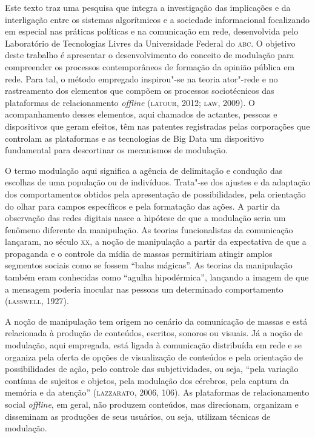 
\noindent{}Este texto traz uma pesquisa que integra a investigação das implicações
e da interligação entre os sistemas algorítmicos e a sociedade
informacional focalizando em especial nas práticas políticas e na
comunicação em rede, desenvolvida pelo Laboratório de Tecnologias Livres
da Universidade Federal do \textsc{abc}. O objetivo deste trabalho é apresentar o
desenvolvimento do conceito de modulação para compreender os processos
contemporâneos de formação da opinião pública em rede. Para tal, o
método empregado inspirou"-se na teoria ator"-rede e no rastreamento dos
elementos que compõem os processos sociotécnicos das plataformas de
relacionamento \emph{offline} (\textsc{latour}, 2012; \textsc{law}, 2009). O acompanhamento
desses elementos, aqui chamados de actantes, pessoas e dispositivos que
geram efeitos, têm nas patentes registradas pelas corporações que
controlam as plataformas e as tecnologias de Big Data um dispositivo
fundamental para descortinar os mecanismos de modulação.

O termo modulação aqui significa a agência de delimitação e condução das
escolhas de uma população ou de indivíduos. Trata"-se dos ajustes e da
adaptação dos comportamentos obtidos pela apresentação de
possibilidades, pela orientação do olhar para campos específicos e pela
formatação das ações. A partir da observação das redes digitais nasce a
hipótese de que a modulação seria um fenômeno diferente da manipulação.
As teorias funcionalistas da comunicação lançaram, no século \textsc{xx}, a noção
de manipulação a partir da expectativa de que a propaganda e o controle
da mídia de massas permitiriam atingir amplos segmentos sociais como se
fossem ``balas mágicas''. As teorias da manipulação também eram
conhecidas como ``agulha hipodérmica'', lançando a imagem de que a
mensagem poderia inocular nas pessoas um determinado comportamento
(\textsc{lasswell}, 1927).

A noção de manipulação tem origem no cenário da comunicação de massas e
está relacionada à produção de conteúdos, escritos, sonoros ou visuais.
Já a noção de modulação, aqui empregada, está ligada à comunicação
distribuída em rede e se organiza pela oferta de opções de visualização
de conteúdos e pela orientação de possibilidades de ação, pelo controle
das subjetividades, ou seja, ``pela variação contínua de sujeitos e
objetos, pela modulação dos cérebros, pela captura da memória e da
atenção'' (\textsc{lazzarato}, 2006, 106). As plataformas de relacionamento
social \emph{offline}, em geral, não produzem conteúdos, mas direcionam,
organizam e disseminam as produções de seus usuários, ou seja, utilizam
técnicas de modulação.

